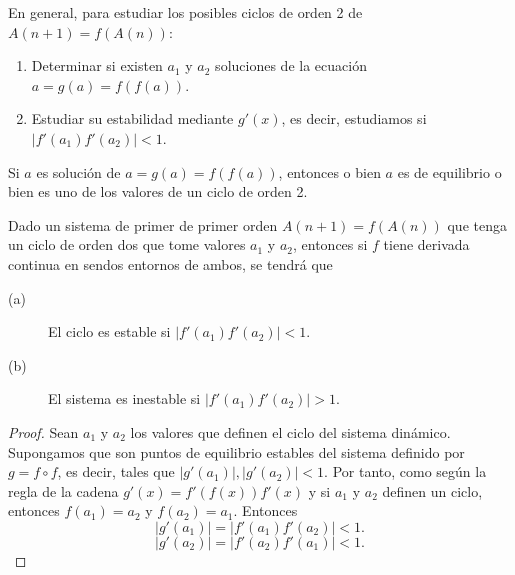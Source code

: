 \begin{observation}
\normalfont En general, para estudiar los posibles ciclos de orden 2 de $\displaystyle A\left(n+1\right) =f\left(A\left(n\right)\right)$:
\begin{enumerate}
\item Determinar si existen $\displaystyle a_{1} $ y $\displaystyle a_{2} $ soluciones de la ecuación $\displaystyle a = g\left(a\right) = f\left(f\left(a\right)\right) $.
\item Estudiar su estabilidad mediante $\displaystyle g'\left(x\right) $, es decir, estudiamos si $\displaystyle \left|f'\left(a_{1}\right)f'\left(a_{2}\right)\right|<1 $.
\end{enumerate}
\end{observation}
\begin{ftheorem}[]
\normalfont Si $\displaystyle a $ es solución de $\displaystyle a = g\left(a\right) = f\left(f\left(a\right)\right) $, entonces o bien $\displaystyle a $ es de equilibrio o bien es uno de los valores de un ciclo de orden 2.
\end{ftheorem}
\begin{ftheorem}[]
\normalfont Dado un sistema de primer de primer orden $\displaystyle A\left(n+1\right) = f\left(A\left(n\right)\right) $ que tenga un ciclo de orden dos que tome valores $\displaystyle a_{1} $ y $\displaystyle a_{2} $, entonces si $\displaystyle f $ tiene derivada continua en sendos entornos de ambos, se tendrá que
\begin{description}
\item[(a)] El ciclo es estable si $\displaystyle \left|f'\left(a_{1}\right)f'\left(a_{2}\right)\right|<1 $.
\item[(b)] El sistema es inestable si $\displaystyle \left|f'\left(a_{1}\right)f'\left(a_{2}\right)\right|>1 $.
\end{description}
\end{ftheorem}
\begin{proof}
Sean $\displaystyle a_{1} $ y $\displaystyle a_{2} $ los valores que definen el ciclo del sistema dinámico. Supongamos que son puntos de equilibrio estables del sistema definido por $\displaystyle g = f\circ f $, es decir, tales que $\displaystyle \left|g'\left(a_{1}\right)\right|, \left|g'\left(a_{2}\right)\right|<1 $. Por tanto, como según la regla de la cadena $\displaystyle g'\left(x\right) = f'\left(f\left(x\right)\right)f'\left(x\right) $ y si $\displaystyle a_{1} $ y $\displaystyle a_{2} $ definen un ciclo, entonces $\displaystyle f\left(a_{1}\right)= a_{2} $ y $\displaystyle f\left(a_{2}\right)=a_{1} $. Entonces
\[ \left|g'\left(a_{1}\right)\right| = \left|f'\left(a_{1}\right)f'\left(a_{2}\right)\right| < 1 .\]
\[ \left|g'\left(a_{2}\right)\right| = \left|f'\left(a_{2}\right)f'\left(a_{1}\right)\right| < 1 .\]
\end{proof}
